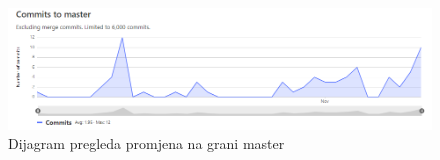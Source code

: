 		
			
		
		\begin{figure}[H]
			\begin{center}
				\includegraphics[width=15cm]{slike/master.png}
			\end{center}
			\caption{Dijagram pregleda promjena na grani master}
			\label{fig:master}
		\end{figure}
		
